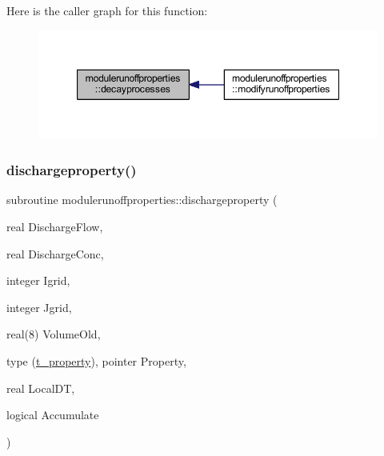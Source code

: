 Here is the caller graph for this function\+:\nopagebreak
\begin{figure}[H]
\begin{center}
\leavevmode
\includegraphics[width=347pt]{namespacemodulerunoffproperties_a22e352c7bc8cde1c67133693821b9c46_icgraph}
\end{center}
\end{figure}
\mbox{\label{namespacemodulerunoffproperties_a0c6359324c15a7b6b781861fed41ffb8}} 
\subsubsection{\texorpdfstring{dischargeproperty()}{dischargeproperty()}}
{\footnotesize\ttfamily subroutine modulerunoffproperties\+::dischargeproperty (\begin{DoxyParamCaption}\item[{real}]{Discharge\+Flow,  }\item[{real}]{Discharge\+Conc,  }\item[{integer}]{Igrid,  }\item[{integer}]{Jgrid,  }\item[{real(8)}]{Volume\+Old,  }\item[{type (\mbox{\hyperlink{structmodulerunoffproperties_1_1t__property}{t\+\_\+property}}), pointer}]{Property,  }\item[{real}]{Local\+DT,  }\item[{logical}]{Accumulate }\end{DoxyParamCaption})\hspace{0.3cm}{\ttfamily [private]}}

